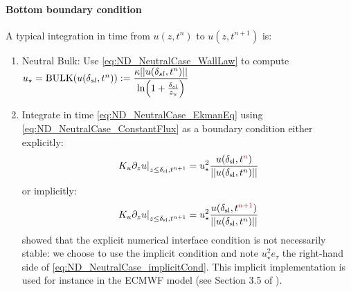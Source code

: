 \paragraph{Bottom boundary condition}
A typical integration in time from $u(z, t^{n})$ to
$u(z, t^{n+1})$ is:
\begin{enumerate}
	\item Neutral Bulk: Use \eqref{eq:ND_NeutralCase_WallLaw}
		to compute $u_\star = {\rm BULK}(u(\delta_{sl}, t^n))
		:= \displaystyle \frac{\kappa ||u(\delta_{sl}, t^n)||}
			{\ln(1+\frac{\delta_{sl}}{z_{u}})}$
  \item Integrate in time \eqref{eq:ND_NeutralCase_EkmanEq}
  using \eqref{eq:ND_NeutralCase_ConstantFlux} as a boundary condition
		either explicitly: 
	\begin{equation}
		\left.K_u \partial_z u
		\right|_{z\leq \delta_{\rm sl}, t^{n+1}}
		= u_\star^2 \frac{u(\delta_{\rm sl},
		t^{\emphase{n}})}
		{||u(\delta_{\rm sl}, t^n)||}
	\end{equation}
		or implicitly:
	\begin{equation}
		\label{eq:ND_NeutralCase_implicitCond}
		\left.K_u \partial_z u
		\right|_{z\leq \delta_{\rm sl}, t^{n+1}}
		= u_\star^2 \frac{u(\delta_{\rm sl},
		t^{\emphase{n+1}})}
		{||u(\delta_{\rm sl}, t^n)||}
	\end{equation}
	\cite{lemarie_stability_2015} showed that the explicit
	numerical interface condition is not necessarily
	stable: we choose to use the implicit condition and note
		$u_\star^2 e_\tau$ the right-hand side of
		\eqref{eq:ND_NeutralCase_implicitCond}.
	This implicit implementation is used for instance in the
	ECMWF model (see Section 3.5 of \citep{ecmwf_ifs_2020}).
\end{enumerate}
